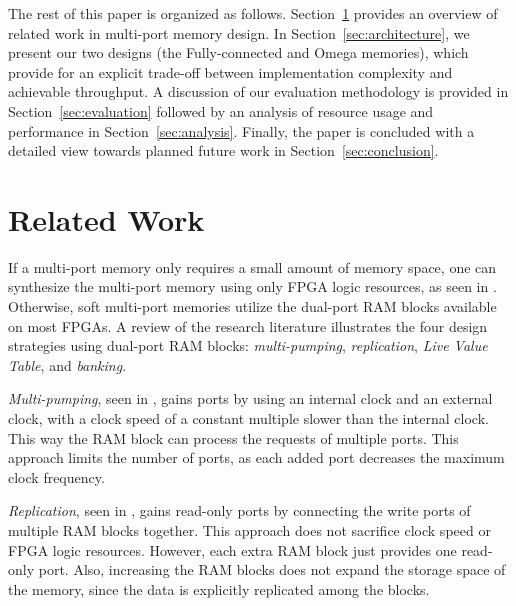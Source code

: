 The rest of this paper is organized as follows. Section~\ref{sec:relatedwork} provides an overview of related work in multi-port memory design. In Section~\ref{sec:architecture}, we present our two designs (the Fully-connected and Omega memories), which provide for an explicit trade-off between implementation complexity and achievable throughput. A discussion of our evaluation methodology is provided in Section~\ref{sec:evaluation} followed by an analysis of resource usage and performance in Section~\ref{sec:analysis}. Finally, the paper is concluded with a detailed view towards planned future work in Section~\ref{sec:conclusion}. 


\section{Related Work}
\label{sec:relatedwork}

If a multi-port memory only requires a small amount of memory space, one can synthesize the multi-port memory using only FPGA logic resources, as seen in \cite{f-scratch:jones}. Otherwise, soft multi-port memories utilize the dual-port RAM blocks available on most FPGAs. A review of the research literature illustrates the four design strategies using dual-port RAM blocks: {\em multi-pumping}, {\em replication}, {\em Live Value Table}, and {\em banking}.

{\em Multi-pumping}, seen in \cite{f-scratch:manjikian,f-scratch:canis,f-scratch:yantir}, gains ports by using an internal clock and an external clock, with a clock speed of a constant multiple slower than the internal clock. This way the RAM block can process the requests of multiple ports. This approach limits the number of ports, as each added port decreases the maximum clock frequency.

{\em Replication}, seen in \cite{f-scratch:fort,f-scratch:mousali,f-scratch:yiannacouras}, gains read-only ports by connecting the write ports of multiple RAM blocks together. This approach does not sacrifice clock speed or FPGA logic resources. However, each extra RAM block just provides one read-only port. Also, increasing the RAM blocks does not expand the storage space of the memory, since the data is explicitly replicated among the blocks.

